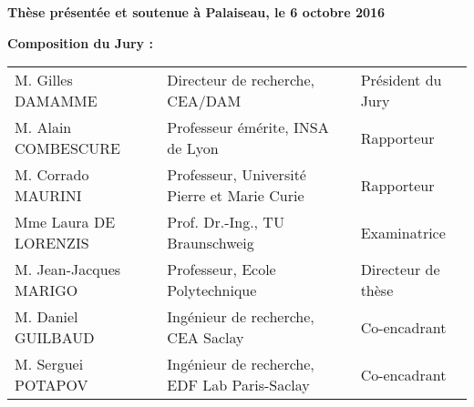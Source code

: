 \begin{titlepage}
\begin{mdframed}
\begin{minipage}[t][22cm][t]{\textwidth}
\vfill
\begin{flushleft}
\large
\textbf{Thèse présentée et soutenue à Palaiseau, le 6 octobre 2016}
\vspace{15pt}

\textbf{Composition du Jury :}

\vspace{15pt}
\begin{tabular}{@{}lll}
M. Gilles DAMAMME & Directeur de recherche, CEA/DAM & Président du Jury \\
M. Alain COMBESCURE & Professeur émérite, INSA de Lyon & Rapporteur \\
M. Corrado MAURINI & Professeur, Université Pierre et Marie Curie & Rapporteur \\
Mme Laura DE LORENZIS & Prof. Dr.-Ing., TU Braunschweig & Examinatrice \\
M. Jean-Jacques MARIGO & Professeur, Ecole Polytechnique & Directeur de thèse \\
M. Daniel GUILBAUD & Ingénieur de recherche, CEA Saclay & Co-encadrant \\
M. Serguei POTAPOV & Ingénieur de recherche, EDF Lab Paris-Saclay & Co-encadrant
\end{tabular}
\end{flushleft}
\end{minipage}
\end{mdframed}
\end{titlepage}

\setcounter{page}{2}
\restoregeometry
